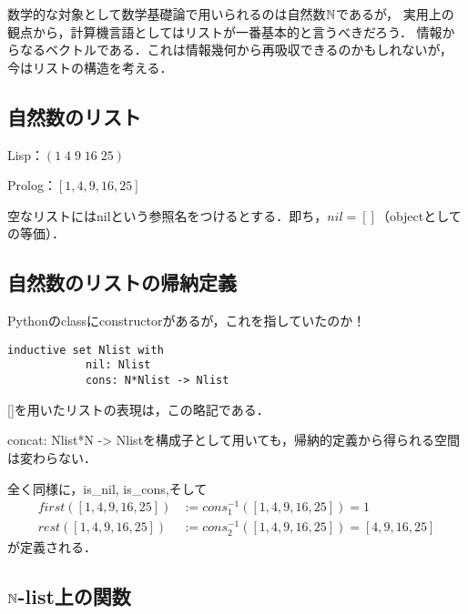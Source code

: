 \documentclass[uplatex, 12pt, dvipdfmx]{jsreport}
\begin{document}
数学的な対象として数学基礎論で用いられるのは自然数$\mathbb{N}$であるが，
実用上の観点から，計算機言語としてはリストが一番基本的と言うべきだろう．
情報からなるベクトルである．これは情報幾何から再吸収できるのかもしれないが，
今はリストの構造を考える．

\subsection{自然数のリスト}

\begin{notation}[list]
    Lisp：$(1\;4\;9\;16\;25)$

    Prolog：$[1,4,9,16,25]$
\end{notation}
\begin{remark}
    空なリストにはnilという参照名をつけるとする．即ち，$nil=[]$（objectとしての等価）．
\end{remark}

\subsection{自然数のリストの帰納定義}

\begin{definition}[list]
    Pythonのclassにconstructorがあるが，これを指していたのか！
    \begin{lstlisting}[caption=list]
        inductive set Nlist with
            nil: Nlist
            cons: N*Nlist -> Nlist
    \end{lstlisting}
    []を用いたリストの表現は，この略記である．
\end{definition}
\begin{remark}
    concat: Nlist*N -> Nlistを構成子として用いても，帰納的定義から得られる空間は変わらない．
\end{remark}

\begin{example}
    全く同様に，is\_nil, is\_cons,そして
    \begin{align*}
        first([1,4,9,16,25]) &:= cons_1^{-1}([1,4,9,16,25]) = 1\\
        rest([1,4,9,16,25]) &:= cons_2^{-1}([1,4,9,16,25]) = [4,9,16,25]
    \end{align*}
    が定義される．
\end{example}

\subsection{$\mathbb{N}$-list上の関数}
\end{document}
